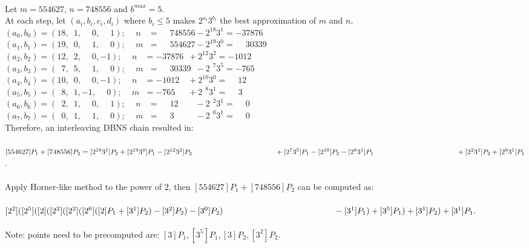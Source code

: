  \\
Let $m = 554627$, $n = 748556$ and $b^{max} = 5$. \\
At each step, let $(a_i,b_i,c_i,d_i)$ where $b_i \le 5$ makes $2^{a_i}3^{b_i}$ the best approximation of $m$ and $n$. \\
$(a_0,b_0) = (18,\phantom{0}1,\phantom{-}0,\phantom{-}1)$;		$\quad n\phantom{m} = \phantom{-}748556			- 2^{18}3^{1}		= -37876$ \\
$(a_1,b_1) = (19,\phantom{0}0,\phantom{-}1,\phantom{-}0)$;		$\quad m\phantom{n} = \phantom{-}554627			- 2^{19}3^{0}		= \phantom{-}30339$ \\
$(a_2,b_2) = (12,\phantom{0}2,\phantom{-}0,-1)$;			$\quad n\phantom{m} = -37876\phantom{0}			+ 2^{12}3^{2}		= -1012$ \\
$(a_3,b_3) = (\phantom{0}7,\phantom{0}5,\phantom{-}1,\phantom{-}0)$; 	$\quad m\phantom{n} = \phantom{-}30339\phantom{0}	- 2^{\phantom{0}7}3^{5} = -765$ \\
$(a_4,b_4) = (10,\phantom{0}0,\phantom{-}0,-1)$;			$\quad n\phantom{m}=  -1012\phantom{00}			+ 2^{10}3^{0}		= \phantom{-}12$ \\
$(a_5,b_5) = (\phantom{0}8,\phantom{0}1,-1,\phantom{-}0)$; 		$\quad m\phantom{n}=  -765\phantom{000}			+ 2^{\phantom{0}8}3^{1} = \phantom{-}3$ \\
$(a_6,b_6) = (\phantom{0}2,\phantom{0}1,\phantom{-}0,\phantom{-}1)$; 	$\quad n\phantom{m}= \phantom{-}12\phantom{0000}	- 2^{\phantom{0}2}3^{1} = \phantom{-}0$ \\
$(a_7,b_7) = (\phantom{0}0,\phantom{0}1,\phantom{-}1,\phantom{-}0)$; 	$\quad m\phantom{n}= \phantom{-}3\phantom{00000}	- 2^{\phantom{0}0}3^{1} = \phantom{-}0$ \\
Therefore, an interleaving DBNS chain resulted in: \\
\\
$[554627]P_1 + [748556]P_2 = [2^{18}3^{1}]P_2 + [2^{19}3^{0}]P_1 - [2^{12}3^{2}]P_2 \\
\phantom{[554627]P_1 + [748556]P_2 =}
			+ [2^{7}3^{5}]P_1 - [2^{10}]P_2 - [2^{8}3^{1}]P_1 \\
\phantom{[554627]P_1 + [748556]P_2 =}
			+ [2^{2}3^{1}]P_2 + [2^{0}3^{1}]P_1$. \\
\\
Apply Horner-like method to the power of $2$, then $[554627]P_1 + [748556]P_2$ can be computed as: \\
\\
$[2^2]([2^5]([2]([2^2]([2^2]([2^6]([2]P_1 + [3^1]P_2) - [3^2]P_2) - [3^0]P_2) \\
\phantom{[2^2]([2^5]([2]([2^2]([2^2]([2^6]([2]P_1}
- [3^1]P_1) + [3^5]P_1) + [3^1]P_2) + [3^1]P_1.$ \\
\\
Note: points need to be precomputed are: $[3]P_1, [3^5]P_1, [3]P_2, [3^2]P_2$. \\


